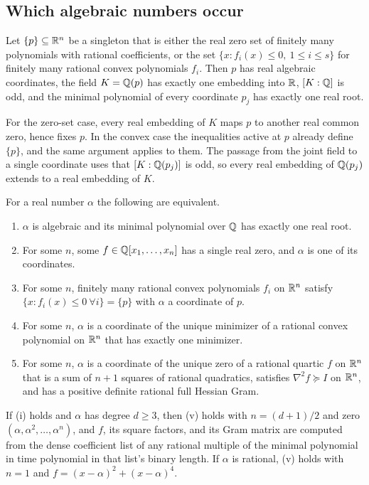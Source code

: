 \subsection{Which algebraic numbers occur}
\label{sec:algebraic-field}

\begin{lemma}
\label{lem:one-real-conjugate}
Let $\{p\}\subseteq\mathbb R^n$ be a singleton that is either the real zero set of
finitely many polynomials with rational coefficients, or the set
$\{x:f_i(x)\le0,\ 1\le i\le s\}$ for finitely many rational convex polynomials
$f_i$. Then $p$ has real algebraic coordinates, the field $K=\mathbb Q(p)$ has exactly
one embedding into $\mathbb R$, $[K:\mathbb Q]$ is odd, and the minimal polynomial of every
coordinate $p_j$ has exactly one real root.
\end{lemma}

For the zero-set case, every real embedding of $K$ maps $p$ to another real
common zero, hence fixes $p$. In the convex case the inequalities active at
$p$ already define $\{p\}$, and the same argument applies to them. The passage
from the joint field to a single coordinate uses that $[K:\mathbb Q(p_j)]$ is odd, so
every real embedding of $\mathbb Q(p_j)$ extends to a real embedding of $K$.

\begin{theorem}
\label{thm:singleton-field}
For a real number $\alpha$ the following are equivalent.
\begin{enumerate}[label=(\roman*)]
\item $\alpha$ is algebraic and its minimal polynomial over $\mathbb Q$ has exactly
  one real root.
\item For some $n$, some $f\in\mathbb Q[x_1,\ldots,x_n]$ has a single real zero, and
  $\alpha$ is one of its coordinates.
\item For some $n$, finitely many rational convex polynomials $f_i$ on $\mathbb R^n$
  satisfy $\{x:f_i(x)\le0\ \forall i\}=\{p\}$ with $\alpha$ a coordinate
  of $p$.
\item For some $n$, $\alpha$ is a coordinate of the unique minimizer of a
  rational convex polynomial on $\mathbb R^n$ that has exactly one minimizer.
\item For some $n$, $\alpha$ is a coordinate of the unique zero of a rational
  quartic $f$ on $\mathbb R^n$ that is a sum of $n+1$ squares of rational quadratics,
  satisfies $\nabla^2f\succeq I$ on $\mathbb R^n$, and has a positive definite
  rational full Hessian Gram.
\end{enumerate}
If (i) holds and $\alpha$ has degree $d\ge3$, then (v) holds with
$n=(d+1)/2$ and zero $(\alpha,\alpha^2,\ldots,\alpha^n)$, and $f$, its square
factors, and its Gram matrix are computed from the dense coefficient list of
any rational multiple of the minimal polynomial in time polynomial in that
list's binary length. If $\alpha$ is rational, (v) holds with $n=1$ and
$f=(x-\alpha)^2+(x-\alpha)^4$.
\end{theorem}


